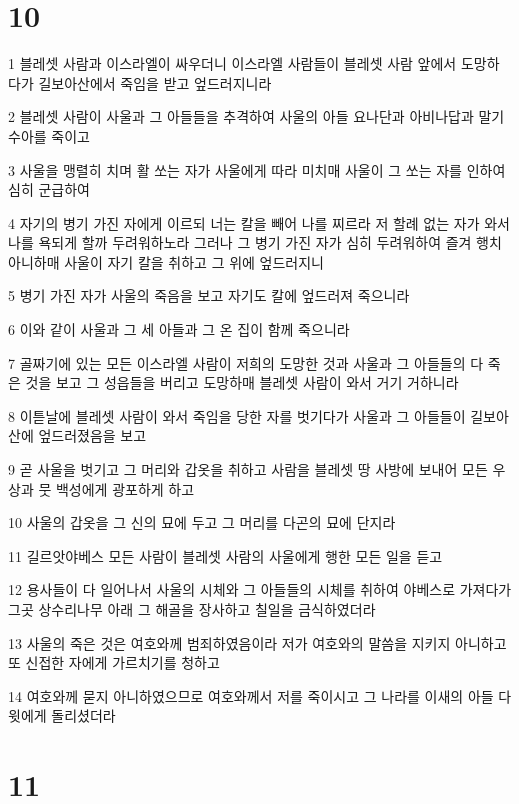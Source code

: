 \chapter{10}

\par 1 블레셋 사람과 이스라엘이 싸우더니 이스라엘 사람들이 블레셋 사람 앞에서 도망하다가 길보아산에서 죽임을 받고 엎드러지니라
\par 2 블레셋 사람이 사울과 그 아들들을 추격하여 사울의 아들 요나단과 아비나답과 말기수아를 죽이고
\par 3 사울을 맹렬히 치며 활 쏘는 자가 사울에게 따라 미치매 사울이 그 쏘는 자를 인하여 심히 군급하여
\par 4 자기의 병기 가진 자에게 이르되 너는 칼을 빼어 나를 찌르라 저 할례 없는 자가 와서 나를 욕되게 할까 두려워하노라 그러나 그 병기 가진 자가 심히 두려워하여 즐겨 행치 아니하매 사울이 자기 칼을 취하고 그 위에 엎드러지니
\par 5 병기 가진 자가 사울의 죽음을 보고 자기도 칼에 엎드러져 죽으니라
\par 6 이와 같이 사울과 그 세 아들과 그 온 집이 함께 죽으니라
\par 7 골짜기에 있는 모든 이스라엘 사람이 저희의 도망한 것과 사울과 그 아들들의 다 죽은 것을 보고 그 성읍들을 버리고 도망하매 블레셋 사람이 와서 거기 거하니라
\par 8 이튿날에 블레셋 사람이 와서 죽임을 당한 자를 벗기다가 사울과 그 아들들이 길보아산에 엎드러졌음을 보고
\par 9 곧 사울을 벗기고 그 머리와 갑옷을 취하고 사람을 블레셋 땅 사방에 보내어 모든 우상과 뭇 백성에게 광포하게 하고
\par 10 사울의 갑옷을 그 신의 묘에 두고 그 머리를 다곤의 묘에 단지라
\par 11 길르앗야베스 모든 사람이 블레셋 사람의 사울에게 행한 모든 일을 듣고
\par 12 용사들이 다 일어나서 사울의 시체와 그 아들들의 시체를 취하여 야베스로 가져다가 그곳 상수리나무 아래 그 해골을 장사하고 칠일을 금식하였더라
\par 13 사울의 죽은 것은 여호와께 범죄하였음이라 저가 여호와의 말씀을 지키지 아니하고 또 신접한 자에게 가르치기를 청하고
\par 14 여호와께 묻지 아니하였으므로 여호와께서 저를 죽이시고 그 나라를 이새의 아들 다윗에게 돌리셨더라

\chapter{11}

